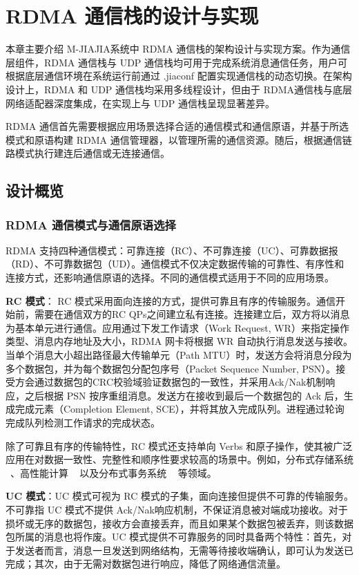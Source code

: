\chapter{RDMA 通信栈的设计与实现}\label{chap:RJIAJIA}{
本章主要介绍 M-JIAJIA系统中 RDMA 通信栈的架构设计与实现方案。作为通信层组件，RDMA 通信栈与 UDP 通信栈均可用于完成系统消息通信任务，用户可根据底层通信环境在系统运行前通过 .jiaconf 配置实现通信栈的动态切换。在架构设计上，RDMA 和 UDP 通信栈均采用多线程设计，但由于 RDMA通信栈与底层网络适配器深度集成，在实现上与 UDP 通信栈呈现显著差异。

RDMA 通信首先需要根据应用场景选择合适的通信模式和通信原语，并基于所选模式和原语构建 RDMA 通信管理器，以管理所需的通信资源。随后，根据通信链路模式执行建连后通信或无连接通信。

\section{设计概览}

\subsection{RDMA 通信模式与通信原语选择}
RDMA 支持四种通信模式：可靠连接（RC）、不可靠连接（UC）、可靠数据报（RD）、不可靠数据包（UD）。通信模式不仅决定数据传输的可靠性、有序性和连接方式，还影响通信原语的选择。不同的通信模式适用于不同的应用场景。

\textbf{RC 模式}： RC 模式采用面向连接的方式，提供可靠且有序的传输服务。通信开始前，需要在通信双方的RC QPs之间建立私有连接。连接建立后，双方将以消息为基本单元进行通信。应用通过下发工作请求（Work Request, WR）来指定操作类型、消息内存地址及大小，RDMA 网卡将根据 WR 自动执行消息发送与接收。当单个消息大小超出路径最大传输单元（Path MTU）时，发送方会将消息分段为多个数据包，并为每个数据包分配包序号（Packet Sequence Number, PSN）。接受方会通过数据包的CRC校验域验证数据包的一致性，并采用Ack/Nak机制响应，之后根据 PSN 按序重组消息。发送方在接收到最后一个数据包的 Ack 后，生成完成元素（Completion Element, SCE），并将其放入完成队列。进程通过轮询完成队列检测工作请求的完成状态。

除了可靠且有序的传输特性，RC 模式还支持单向 Verbs 和原子操作，使其被广泛应用在对数据一致性、完整性和顺序性要求较高的场景中。例如，分布式存储系统 ~\citep{christopher2013pilaf, drago2014farm, xingda2020xstore}、高性能计算 ~\citep{graham2005OpenMPI, Huang2006MVAPICH2} 以及分布式事务系统 ~\citep{xingda2018DrTM+H} 等领域。

\textbf{UC 模式}：UC 模式可视为 RC 模式的子集，面向连接但提供不可靠的传输服务。不可靠指 UC 模式不提供 Ack/Nak响应机制，不保证消息被对端成功接收。对于损坏或无序的数据包，接收方会直接丢弃，而且如果某个数据包被丢弃，则该数据包所属的消息也将作废。UC 模式提供不可靠服务的同时具备两个特性：首先，对于发送者而言，消息一旦发送到网络结构，无需等待接收端确认，即可认为发送已完成；其次，由于无需对数据包进行响应，降低了网络通信流量。

}
